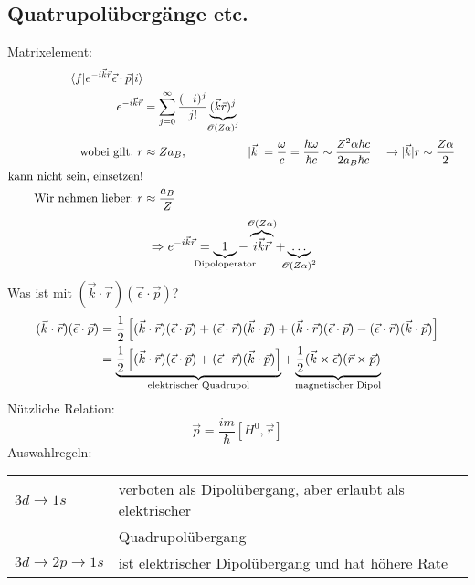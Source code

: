 \subsection{Quatrupolübergänge etc.}
	Matrixelement:
		\begin{align*}
			\braket{f | e^{-i \vec{k} \vec{r}} \vec{\epsilon} \cdot \vec{p} | i} \\
			e^{-i \vec{k} \vec{r}} &= 
			\sum_{j = 0}^{\infty} \frac{(-i)^j}{j!} 
			\underbrace{(\vec{k} \vec{r})^j}_{\mathclap{\mathscr{O} (Z \alpha)^j}} \\
			\text{wobei gilt:~} r &\approx Z a_B ,&
			|\vec{k}| &= \frac{\omega}{c} = \frac{\hbar \omega}{\hbar c} 
			\sim \frac{Z^2 \alpha \hbar c}{2 a_B \hbar c} 
			& &\rightarrow |\vec{k}| r \sim \frac{Z \alpha}{2} \\
			\text{kann nicht sein, einsetzen!}\\
			\text{Wir nehmen lieber:~} r &\approx \frac{a_B}{Z}
		\end{align*} 
		\begin{align*}
			\Rightarrow e^{-i \vec{k} \vec{r}} &=
			\underbrace{1}_{\mathclap{\text{Dipoloperator}}}
			- \overbrace{i \vec{k} \vec{r}}^{\mathclap{\mathscr{O} (Z \alpha)}}
			+ \underbrace{\ldots}_{\mathclap{\mathscr{O} (Z\alpha)^2}}
		\end{align*}
	Was ist mit $(\vec{k} \cdot \vec{r})(\vec{\epsilon} \cdot \vec{p})$?
		\begin{align*}
			(\vec{k} \cdot \vec{r})(\vec{\epsilon} \cdot \vec{p}) &=
			\frac{1}{2} \left[
				(\vec{k} \cdot \vec{r})(\vec{\epsilon} \cdot \vec{p})
				+ (\vec{\epsilon} \cdot \vec{r})(\vec{k} \cdot \vec{p})
				+ (\vec{k} \cdot \vec{r})(\vec{\epsilon} \cdot \vec{p})
				- (\vec{\epsilon} \cdot \vec{r})(\vec{k} \cdot \vec{p})
			\right] \\
			&= \underbrace{\frac{1}{2} \left[
				(\vec{k} \cdot \vec{r})(\vec{\epsilon} \cdot \vec{p})
				+ (\vec{\epsilon} \cdot \vec{r})(\vec{k} \cdot \vec{p})
			\right]}_{\mathclap{\text{elektrischer Quadrupol}}}
			+ \underbrace{\frac{1}{2} 
			(\vec{k} \times \vec{\epsilon})(\vec{r} \times \vec{p})}_{\mathclap{\text{magnetischer Dipol}}}
		\end{align*}
	Nützliche Relation: 
		\begin{equation*}
			\vec{p} = \frac{im}{\hbar} [H^0, \vec{r}]
		\end{equation*}
	Auswahlregeln:
	
	\begin{tabular}{l l} 
		$3d \rightarrow 1s$ & verboten als Dipolübergang, aber erlaubt als elektrischer  \\
		& Quadrupolübergang \\
		$3d \rightarrow 2p \rightarrow 1s$ & ist elektrischer Dipolübergang und hat höhere Rate
	\end{tabular}
